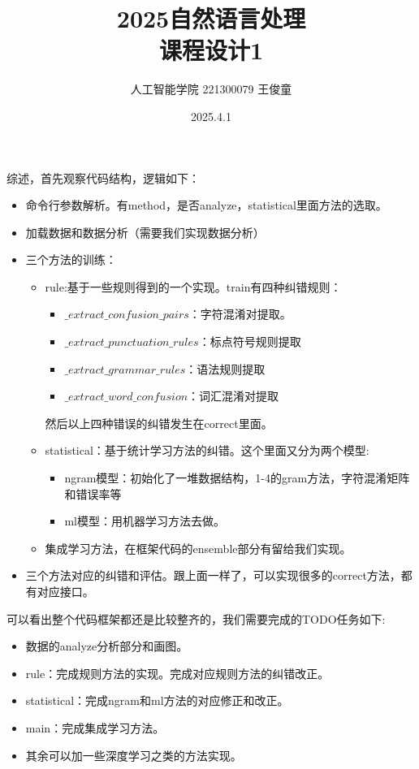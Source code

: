 \documentclass[answers]{exam}  %
\title{2025自然语言处理 \\ 课程设计1}
\date{2025.4.1}
\author{人工智能学院 221300079 王俊童}
\begin{document}
\maketitle
综述，首先观察代码结构，逻辑如下：
\begin{itemize}
    \item 命令行参数解析。有method，是否analyze，statistical里面方法的选取。
    \item 加载数据和数据分析（需要我们实现数据分析）
    \item 三个方法的训练：
    \begin{itemize}
        \item rule:基于一些规则得到的一个实现。train有四种纠错规则：
        \begin{itemize}
            \item $\_extract\_confusion\_pairs$：字符混淆对提取。
            \item $\_extract\_punctuation\_rules$：标点符号规则提取
            \item $\_extract\_grammar\_rules$：语法规则提取
            \item $\_extract\_word\_confusion$：词汇混淆对提取
        \end{itemize}
        然后以上四种错误的纠错发生在correct里面。
        \item statistical：基于统计学习方法的纠错。这个里面又分为两个模型:
        \begin{itemize}
            \item ngram模型：初始化了一堆数据结构，1-4的gram方法，字符混淆矩阵和错误率等
            \item ml模型：用机器学习方法去做。
        \end{itemize}
        \item 集成学习方法，在框架代码的ensemble部分有留给我们实现。
    \end{itemize}
    \item 三个方法对应的纠错和评估。跟上面一样了，可以实现很多的correct方法，都有对应接口。
\end{itemize}
可以看出整个代码框架都还是比较整齐的，我们需要完成的TODO任务如下:
\begin{itemize}
    \item 数据的analyze分析部分和画图。
    \item rule：完成规则方法的实现。完成对应规则方法的纠错改正。
    \item statistical：完成ngram和ml方法的对应修正和改正。
    \item main：完成集成学习方法。
    \item 其余可以加一些深度学习之类的方法实现。
\end{itemize}
\end{document}
